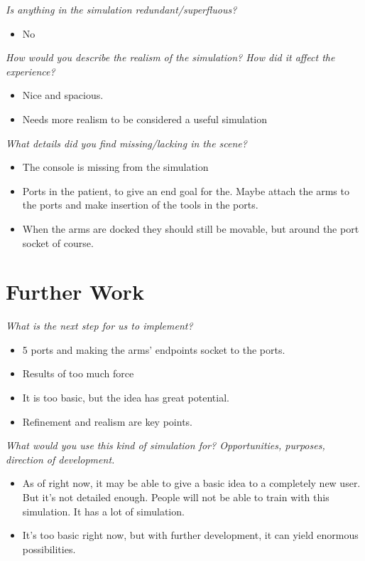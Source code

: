 \textit{Is anything in the simulation redundant/superfluous?}
\begin{itemize}
	\item No
\end{itemize}

\textit{How would you describe the realism of the simulation? How did it affect the experience?}
\begin{itemize}
	\item Nice and spacious.
	\item Needs more realism to be considered a useful simulation
\end{itemize}

\textit{What details did you find missing/lacking in the scene?}
\begin{itemize}
	\item The console is missing from the simulation
	\item Ports in the patient, to give an end goal for the. Maybe attach the arms to the ports and make insertion of the tools in the ports.
	\item When the arms are docked they should still be movable, but around the port socket of course.
\end{itemize}

\section{Further Work}
\textit{What is the next step for us to implement?}
\begin{itemize}
	\item 5 ports and making the arms’ endpoints socket to the ports. 
	\item Results of too much force
	\item It is too basic, but the idea has great potential.
	\item Refinement and realism are key points.
\end{itemize}

\textit{What would you use this kind of simulation for? Opportunities, purposes, direction of development.}
\begin{itemize}
	\item As of right now, it may be able to give a basic idea to a completely new user. But it’s not detailed enough. People will not be able to train with this simulation. It has a lot of simulation.
	\item It’s too basic right now, but with further development, it can yield enormous possibilities. 
\end{itemize}

